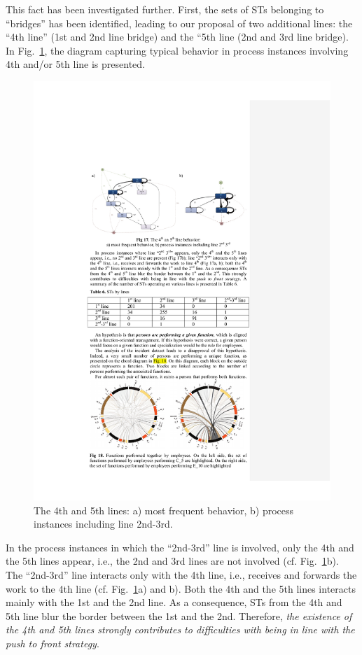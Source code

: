 \documentclass[lnbip]{svmultln}
\begin{document}
This fact has been investigated further. First, the sets of STs belonging to ``bridges'' has been identified, leading to our proposal of two additional lines: the ``4th line'' (1st and 2nd line bridge) and the ``5th line (2nd and 3rd line bridge). In Fig.~\ref{fig:4and5thLines}, the diagram capturing typical behavior in process instances involving 4th and/or 5th line is presented. 

\begin{figure}
\centering
\includegraphics[width=.9\textwidth]{"figs/pic 19"}
\caption{The 4th and 5th lines: a) most frequent behavior, b) process instances including line 2nd-3rd.}
\label{fig:4and5thLines}
\end{figure}

In the process instances in which the ``2nd-3rd'' line is involved, only the 4th and the 5th lines appear, i.e., the 2nd and 3rd lines are not involved (cf. Fig.~\ref{fig:4and5thLines}b). The ``2nd-3rd'' line interacts only with the 4th line, i.e., receives and forwards the work to the 4th line (cf. Fig.~\ref{fig:4and5thLines}a) and b). Both the 4th and the 5th lines interacts mainly with the 1st and the 2nd line. As a consequence, STs from the 4th and 5th line blur the border between the 1st and the 2nd. Therefore, \emph{the existence of the 4th and 5th lines strongly contributes to difficulties with being in line with the push to front strategy}. 
\end{document}
